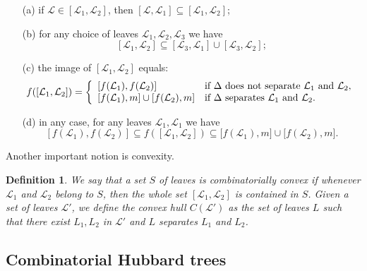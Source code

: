 \documentclass[11pt]{amsart}
\newtheorem{definition}[theorem]{Definition}
\begin{document}
\begin{itemize}
\item[(a)]
if $\mathcal{L} \in [\mathcal{L}_1, \mathcal{L}_2]$, then $[\mathcal{L}, \mathcal{L}_1] \subseteq [\mathcal{L}_1, \mathcal{L}_2]$;
\item[(b)]
for any choice of leaves $\mathcal{L}_1, \mathcal{L}_2, \mathcal{L}_3$ we have 
$$[\mathcal{L}_1, \mathcal{L}_2] \subseteq [\mathcal{L}_3, \mathcal{L}_1] \cup [\mathcal{L}_3, \mathcal{L}_2];$$
\item[(c)]
the image of $[\mathcal{L}_1, \mathcal{L}_2]$ equals: 
$$f([\mathcal{L}_1, \mathcal{L}_2])  = 
\left\{ \begin{array}{ll} 
\lbrack f(\mathcal{L}_1), f(\mathcal{L}_2) \rbrack &  \textup{if }\Delta\textup{ does not separate }\mathcal{L}_1\textup{ and }\mathcal{L}_2, \\
\lbrack f(\mathcal{L}_1), m \rbrack \cup \lbrack f(\mathcal{L}_2), m \rbrack & \textup{if }\Delta\textup{ separates }\mathcal{L}_1\textup{ and }\mathcal{L}_2. 
\end{array}
\right.$$
\item[(d)]
in any case, for any leaves $\mathcal{L}_1, \mathcal{L}_1$ we have 
$$[f(\mathcal{L}_1), f(\mathcal{L}_2)]  \subseteq f([\mathcal{L}_1, \mathcal{L}_2]) \subseteq \lbrack f(\mathcal{L}_1), m \rbrack \cup \lbrack f(\mathcal{L}_2), m \rbrack.$$
\end{itemize}

Another important notion is convexity. 

\begin{definition}
We say that a set $S$ of leaves is \emph{combinatorially convex} if whenever $\mathcal{L}_1$ and $\mathcal{L}_2$ 
belong to $S$, then the whole set $[\mathcal{L}_1, \mathcal{L}_2]$ is contained in $S$.
Given a set of leaves $\mathcal{L}'$, we define the \emph{convex hull} $C(\mathcal{L}')$ as the set of leaves $L$ such that 
there exist $L_1, L_2$ in $\mathcal{L}'$ and $L$ separates $L_1$ and $L_2$. 
\end{definition}










\subsection{Combinatorial Hubbard trees}
\end{document}
